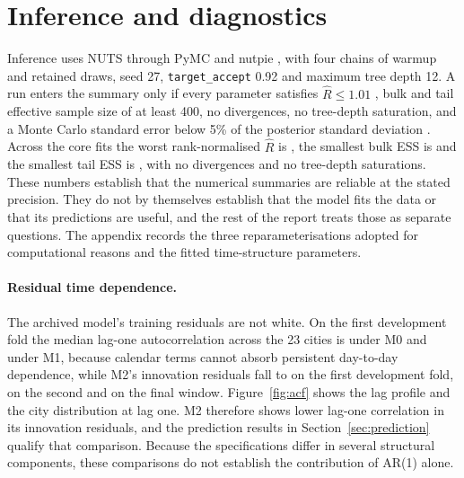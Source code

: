 \documentclass{article}
\begin{document}
\section{Inference and diagnostics}
\label{sec:diagnostics}

Inference uses NUTS through PyMC \citep{abrilpla2023pymc} and nutpie \citep{nutpie}, with four chains
of \WarmupDraws{} warmup and \WarmupDraws{} retained draws, seed 27, \texttt{target\_accept} 0.92 and
maximum tree depth 12. A run enters the summary only if every parameter satisfies $\hat{R}\le1.01$
\citep{vehtari2021rank,gelman1992inference}, bulk and tail effective sample size of at least 400, no
divergences, no tree-depth saturation, and a Monte Carlo standard error below 5\% of the posterior
standard deviation \citep{betancourt2017conceptual}. Across the \CoreFits{} core fits the worst
rank-normalised $\hat{R}$ is \CoreMaxRhat, the smallest bulk ESS is \CoreMinEss{} and the smallest
tail ESS is \CoreMinTailEss, with no divergences and no tree-depth saturations. These numbers
establish that the numerical summaries are reliable at the stated precision. They do not by
themselves establish that the model fits the data or that its predictions are useful, and the rest of
the report treats those as separate questions. The appendix records the three reparameterisations
adopted for computational reasons and the fitted time-structure parameters.

\paragraph{Residual time dependence.}
The archived model's training residuals are not white. On the first development fold the median
lag-one autocorrelation across the 23 cities is \MZeroDevOneLagOne{} under M0 and
\MOneDevOneLagOne{} under M1, because calendar terms cannot absorb persistent day-to-day dependence,
while M2's innovation residuals fall to \MTwoDevOneLagOne{} on the first development fold,
\MTwoDevTwoLagOne{} on the second and \MTwoFinalLagOne{} on the final window. Figure~\ref{fig:acf}
shows the lag profile and the city distribution at lag one. M2 therefore shows lower lag-one
correlation in its innovation residuals, and the prediction results in Section~\ref{sec:prediction}
qualify that comparison. Because the specifications differ in several structural components, these
comparisons do not establish the contribution of AR(1) alone.
\end{document}
